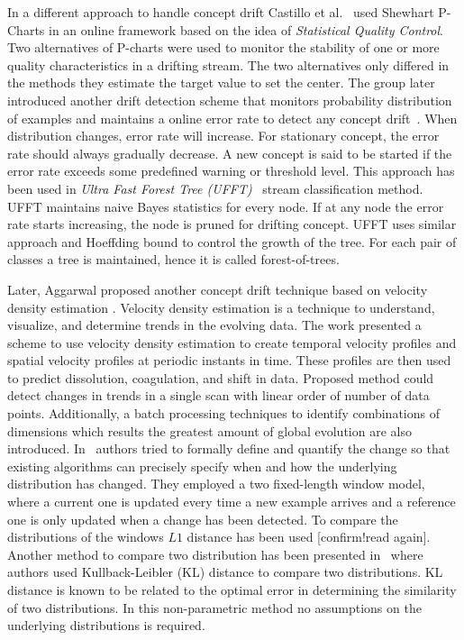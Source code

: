 In a different approach to handle concept drift Castillo et al.~\cite{gama03:drift} used Shewhart P-Charts in an online framework based on the idea of \textit{Statistical Quality Control}. Two alternatives of P-charts were used to monitor the stability of one or more quality characteristics in a drifting stream. The two alternatives only differed in the methods they estimate the target value to set the center. The group later introduced another drift detection scheme that monitors probability distribution of examples and maintains a online error rate to detect any concept drift~\cite{gama04:drift}. When distribution changes, error rate will increase. For stationary concept, the error rate should always gradually decrease. A new concept is said to be started if the error rate exceeds some predefined warning or threshold level. This approach has been used in \textit{Ultra Fast Forest Tree (UFFT)}~\cite{gama04:ft, gama05:ft} stream classification method. UFFT maintains naive Bayes statistics for every node. If at any node the error rate starts increasing, the node is pruned for drifting concept. UFFT uses similar approach and Hoeffding bound to control the growth of the tree. For each pair of classes a tree is maintained, hence it is called forest-of-trees.

Later, Aggarwal proposed another concept drift technique based on velocity density estimation \cite{aggarwal03:condrift}. Velocity density estimation is a technique to understand, visualize, and determine trends in the evolving data. The work presented a scheme to use velocity density estimation to create temporal velocity profiles and spatial velocity profiles at periodic instants in time. These profiles are then used to predict dissolution, coagulation, and shift in data. Proposed method could detect changes in trends in a single scan with linear order of number of data points. Additionally, a batch processing techniques to identify combinations of dimensions which results the greatest amount of global evolution are also introduced. In~\cite{kifer04:condrift} authors tried to formally define and quantify the change so that existing algorithms can precisely specify when and how the underlying distribution has changed. They employed a two fixed-length window model, where a current one is updated every time a new example arrives and a reference one is only updated when a change has been detected. To compare the distributions of the windows $L1$ distance has been used [confirm!read again]. Another method to compare two distribution has been presented in~\cite{dasu05:condrift} where authors used Kullback-Leibler (KL) distance to compare two distributions. KL distance is known to be related to the optimal error in determining the similarity of two distributions. In this non-parametric method no assumptions on the underlying distributions is required. 


